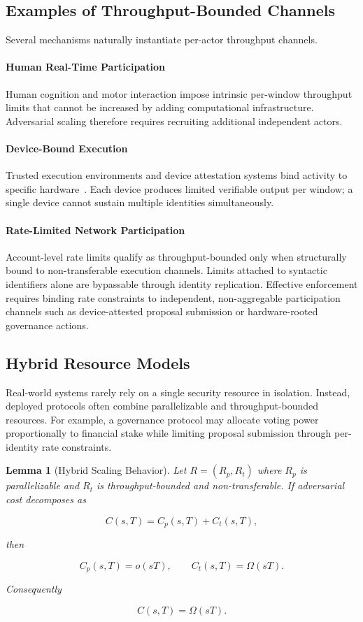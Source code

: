 \documentclass[journal]{IEEEtran}
\newtheorem{lemma}{Lemma}
\begin{document}
	\subsection{Examples of Throughput-Bounded Channels}
	Several mechanisms naturally instantiate per-actor throughput
	channels.
	
	\paragraph{Human Real-Time Participation}
	Human cognition and motor interaction impose intrinsic per-window
	throughput limits that cannot be increased by adding computational
	infrastructure. Adversarial scaling therefore requires recruiting
	additional independent actors.
	
	\paragraph{Device-Bound Execution}
	Trusted execution environments and device attestation systems bind
	activity to specific hardware~\cite{costan2016intel}.
	Each device produces limited verifiable output per window;
	a single device cannot sustain multiple identities simultaneously.
	
	\paragraph{Rate-Limited Network Participation}
	Account-level rate limits qualify as throughput-bounded only when
	structurally bound to non-transferable execution channels.
	Limits attached to syntactic identifiers alone are bypassable
	through identity replication.
	Effective enforcement requires binding rate constraints to
	independent, non-aggregable participation channels such as
	device-attested proposal submission or hardware-rooted
	governance actions.
	
	\subsection{Hybrid Resource Models}
	
	Real-world systems rarely rely on a single security resource
	in isolation. Instead, deployed protocols often combine
	parallelizable and throughput-bounded resources. For example,
	a governance protocol may allocate voting power proportionally
	to financial stake while limiting proposal submission through
	per-identity rate constraints.
	
	\begin{lemma}[Hybrid Scaling Behavior]
		
		Let $R = (R_p, R_t)$ where $R_p$ is parallelizable
		and $R_t$ is throughput-bounded and non-transferable.
		If adversarial cost decomposes as
		
		\[
		C(s,T) = C_p(s,T) + C_t(s,T),
		\]
		
		then
		
		\[
		C_p(s,T) = o(sT), \qquad
		C_t(s,T) = \Omega(sT).
		\]
		
		Consequently
		
		\[
		C(s,T) = \Omega(sT).
		\]
		
	\end{lemma}
	
\end{document}
